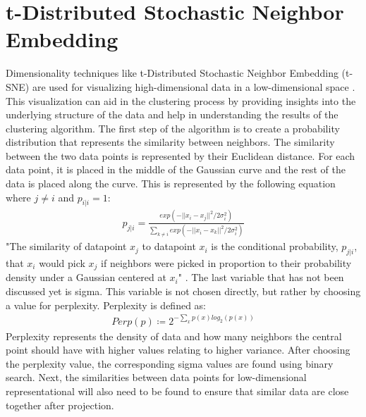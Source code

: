 \section{t-Distributed Stochastic Neighbor Embedding}
Dimensionality techniques like t-Distributed Stochastic Neighbor Embedding (t-SNE) are used for visualizing high-dimensional data in a low-dimensional space \cite{vanDerMaaten2008}. This visualization can aid in the clustering process by providing insights into the underlying structure of the data and help in understanding the results of the clustering algorithm. The first step of the algorithm is to create a probability distribution that represents the similarity between neighbors. The similarity between the two data points is represented by their Euclidean distance. For each data point, it is placed in the middle of the Gaussian curve and the rest of the data is placed along the curve. This is represented by the following equation where $j \neq i$ and $p_{i|i} = 1$:
\begin{align}
p_{j|i} = \frac{exp(-||x_i - x_j||^2 / 2\sigma_i^2)}{\sum_{k \neq i}exp(-||x_i - x_k||^2 / 2\sigma_i^2)}
\end{align}
"The similarity of datapoint $x_j$ to datapoint $x_i$ is the conditional probability, $p_{j|i}$, that $x_i$ would pick $x_j$ if neighbors were picked in proportion to their probability density under a Gaussian centered at $x_i$" \cite{vanDerMaaten2008}. The last variable that has not been discussed yet is sigma. This variable is not chosen directly, but rather by choosing a value for perplexity. Perplexity is defined as:
\begin{align}
Perp(p) \coloneq 2^{-\sum_x p(x)log_2(p(x))}
\end{align}
Perplexity represents the density of data and how many neighbors the central point should have with higher values relating to higher variance. After choosing the perplexity value, the corresponding sigma values are found using binary search. 
Next, the similarities between data points for low-dimensional representational will also need to be found to ensure that similar data are close together after projection. 
